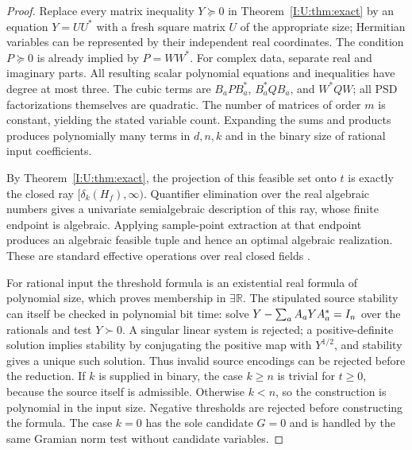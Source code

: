 \begin{proof}
Replace every matrix inequality $Y\succeq0$ in Theorem~\ref{I:U:thm:exact} by an equation $Y=UU^*$ with a fresh square matrix $U$ of the appropriate size; Hermitian variables can be represented by their independent real coordinates. The condition $P\succeq0$ is already implied by $P=WW^*$. For complex data, separate real and imaginary parts. All resulting scalar polynomial equations and inequalities have degree at most three. The cubic terms are $B_aPB_a^*$, $B_a^*QB_a$, and $W^*QW$; all PSD factorizations themselves are quadratic. The number of matrices of order $m$ is constant, yielding the stated variable count. Expanding the sums and products produces polynomially many terms in $d,n,k$ and in the binary size of rational input coefficients.

By Theorem~\ref{I:U:thm:exact}, the projection of this feasible set onto $t$ is exactly the closed ray $[\delta_k(H_f),\infty)$. Quantifier elimination over the real algebraic numbers gives a univariate semialgebraic description of this ray, whose finite endpoint is algebraic. Applying sample-point extraction at that endpoint produces an algebraic feasible tuple and hence an optimal algebraic realization. These are standard effective operations over real closed fields \cite{basu2006,renegar1992}.

For rational input the threshold formula is an existential real formula of polynomial size, which proves membership in $\exists\mathbb R$. The stipulated source stability can itself be checked in polynomial bit time: solve $Y-\sum_aA_aYA_a^*=I_n$ over the rationals and test $Y\succ0$. A singular linear system is rejected; a positive-definite solution implies stability by conjugating the positive map with $Y^{1/2}$, and stability gives a unique such solution. Thus invalid source encodings can be rejected before the reduction. If $k$ is supplied in binary, the case $k\ge n$ is trivial for $t\ge0$, because the source itself is admissible. Otherwise $k<n$, so the construction is polynomial in the input size. Negative thresholds are rejected before constructing the formula. The case $k=0$ has the sole candidate $G=0$ and is handled by the same Gramian norm test without candidate variables.
\end{proof}
